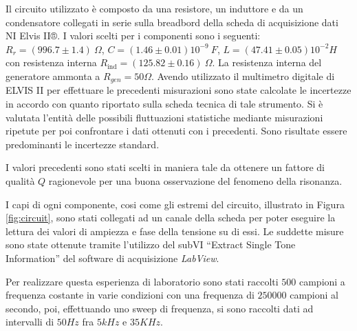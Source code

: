 



Il circuito utilizzato è composto da una resistore, un induttore e da un condensatore collegati in serie
sulla breadbord della scheda di acquisizione dati NI Elvis II®.
I valori scelti per i componenti sono i seguenti: $R_r = (996.7 \pm 1.4) \ \Omega$, $C = (1.46 \pm 0.01)10^{-9} \ F$,
$L = (47.41 \pm 0.05)10^{-2} H$ con resistenza interna $R_{\text{ind}} = (125.82 \pm 0.16) \ \Omega$. La resistenza interna
del generatore ammonta a $R_{gen} = 50 \Omega$.
Avendo utilizzato il multimetro digitale di ELVIS II per effettuare le precedenti misurazioni sono state calcolate le
incertezze in accordo con quanto riportato sulla scheda tecnica di tale strumento. Si è valutata l'entità delle possibili
fluttuazioni statistiche mediante misurazioni ripetute per poi confrontare i dati ottenuti con i precedenti. Sono risultate
essere predominanti le incertezze standard. %


I valori precedenti sono stati scelti in maniera tale da ottenere
un fattore di qualità $Q$ ragionevole per una buona osservazione del fenomeno della risonanza. %

I capi di ogni componente, cosi come gli estremi del circuito, illustrato in Figura \ref{fig:circuit}, sono stati collegati
ad un canale della scheda per poter eseguire la lettura dei valori di ampiezza e fase della tensione su di essi.
Le suddette misure sono state ottenute tramite l'utilizzo del subVI “Extract Single Tone Information” del software di acquisizione
\emph{LabView}.

Per realizzare questa esperienza di laboratorio sono stati raccolti $500$ campioni a frequenza costante in varie condizioni
con una frequenza di $250000$ campioni al secondo, poi, effettuando uno sweep di frequenza, si sono raccolti dati ad
intervalli di $50Hz$ fra $5kHz$ e $35KHz$. %

